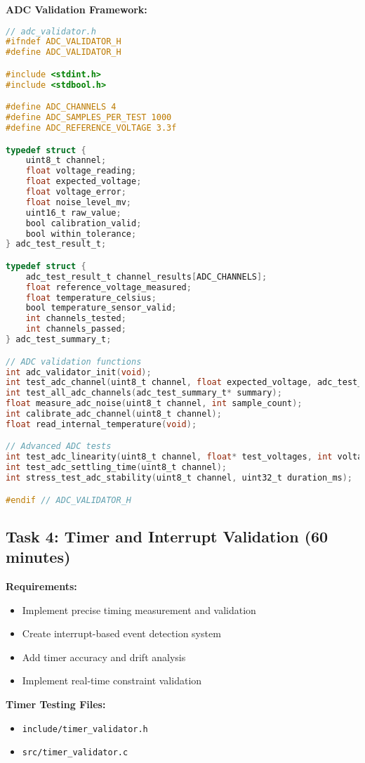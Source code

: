 \documentclass[11pt,a4paper]{article}
\begin{document}
\textbf{ADC Validation Framework:}
\begin{lstlisting}[language=C]
// adc_validator.h
#ifndef ADC_VALIDATOR_H
#define ADC_VALIDATOR_H

#include <stdint.h>
#include <stdbool.h>

#define ADC_CHANNELS 4
#define ADC_SAMPLES_PER_TEST 1000
#define ADC_REFERENCE_VOLTAGE 3.3f

typedef struct {
    uint8_t channel;
    float voltage_reading;
    float expected_voltage;
    float voltage_error;
    float noise_level_mv;
    uint16_t raw_value;
    bool calibration_valid;
    bool within_tolerance;
} adc_test_result_t;

typedef struct {
    adc_test_result_t channel_results[ADC_CHANNELS];
    float reference_voltage_measured;
    float temperature_celsius;
    bool temperature_sensor_valid;
    int channels_tested;
    int channels_passed;
} adc_test_summary_t;

// ADC validation functions
int adc_validator_init(void);
int test_adc_channel(uint8_t channel, float expected_voltage, adc_test_result_t* result);
int test_all_adc_channels(adc_test_summary_t* summary);
float measure_adc_noise(uint8_t channel, int sample_count);
int calibrate_adc_channel(uint8_t channel);
float read_internal_temperature(void);

// Advanced ADC tests
int test_adc_linearity(uint8_t channel, float* test_voltages, int voltage_count);
int test_adc_settling_time(uint8_t channel);
int stress_test_adc_stability(uint8_t channel, uint32_t duration_ms);

#endif // ADC_VALIDATOR_H
\end{lstlisting}

\subsection{Task 4: Timer and Interrupt Validation (60 minutes)}

\textbf{Requirements:}
\begin{itemize}
    \item Implement precise timing measurement and validation
    \item Create interrupt-based event detection system
    \item Add timer accuracy and drift analysis
    \item Implement real-time constraint validation
\end{itemize}

\textbf{Timer Testing Files:}
\begin{itemize}
    \item \texttt{include/timer\_validator.h}
    \item \texttt{src/timer\_validator.c}
\end{itemize}
\end{document}
